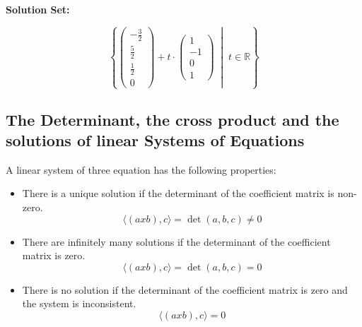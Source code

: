 \textbf{Solution Set:}

\[
	\left\{
	\begin{pmatrix}
		-\frac{3}{2} \\ \frac{5}{2} \\ \frac{1}{2} \\ 0
	\end{pmatrix}
	+ t \cdot
	\begin{pmatrix}
		1 \\ -1 \\ 0 \\ 1
	\end{pmatrix}
	\;\middle|\; t \in \mathbb{R}
	\right\}
\]

\subsection{The Determinant, the cross product and the solutions of linear Systems of Equations}
A linear system of three equation has the following properties:

\begin{itemize}[label=\(-\)]
	\item There is a unique solution if the determinant of the coefficient matrix is non-zero. 
	\[\langle (a x b), c\rangle = \det(a,b,c) \ne 0\]
	\item There are infinitely many solutions if the determinant of the coefficient matrix is zero.
	\[\langle (a x b), c\rangle = \det(a,b,c) = 0\]
	\item There is no solution if the determinant of the coefficient matrix is zero and the system is inconsistent.
	\[\langle (a x b), c\rangle = 0\]
\end{itemize}

\newpage